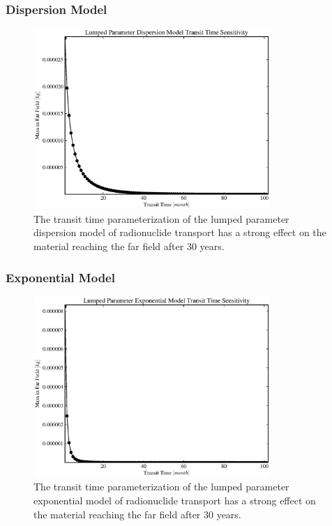 
\begin{frame}[ctb!]
  \frametitle{Dispersion Model} 
\begin{figure}[ht]
\centering
\includegraphics[width=0.8\textwidth]{./images/lpDM_t_t.eps}
\caption[Lumped Parameter Dispersion Model Transit Time Sensitivity]{The transit time 
parameterization of the lumped parameter dispersion model of radionuclide 
transport has a strong effect on the material reaching the far field after 30 
years.  }
\label{fig:lp_t_t_begin}
\end{figure}
\end{frame}


\begin{frame}[ctb!]
\frametitle{Exponential Model} 
\begin{figure}[ht]
\centering
\includegraphics[width=0.8\textwidth]{./images/lpEXPM_t_t.eps}
\caption[Lumped Parameter Exponential Model Transit Time Sensitivity]{The transit time 
parameterization of the lumped parameter exponential model of radionuclide 
transport has a strong effect on the material reaching the far field after 30 
years.  }
\end{figure}
\end{frame}

